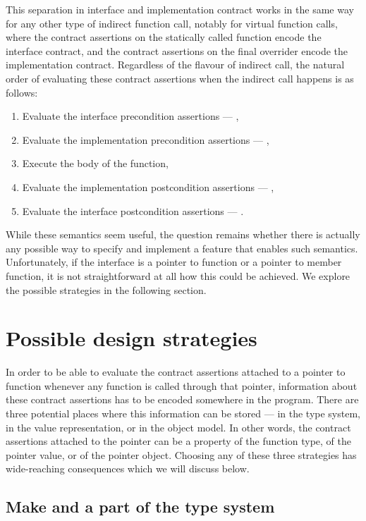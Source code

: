 This separation in interface and implementation contract works in the same way for any other type of indirect function call, notably for virtual function calls, where the contract assertions on the statically called function encode the interface contract, and the contract assertions on the final overrider encode the implementation contract. Regardless of the flavour of indirect call, the natural order of evaluating these contract assertions when the indirect call happens is as follows:
\begin{enumerate}
\item Evaluate the interface precondition assertions --- ,
\item Evaluate the implementation precondition assertions --- ,
\item Execute the body of the function,
\item Evaluate the implementation postcondition assertions --- ,
\item Evaluate the interface postcondition assertions --- .
\end{enumerate}
While these semantics seem useful, the question remains whether there is actually any possible way to specify and implement a feature that enables such semantics. Unfortunately, if the interface is a pointer to function or a pointer to member function, it is not straightforward at all how this could be achieved. We explore the possible strategies in the following section.

\section{Possible design strategies}

In order to be able to evaluate the contract assertions attached to a pointer to function whenever any function is called through that pointer, information about these contract assertions has to be encoded somewhere in the program. There are three potential places where this information can be stored --- in the type system, in the value representation, or in the object model. In other words, the contract assertions attached to the pointer can be a property of the function type, of the pointer value, or of the pointer object. Choosing any of these three strategies has wide-reaching consequences which we will discuss below.

\subsection{Make  and  a part of the type system}

